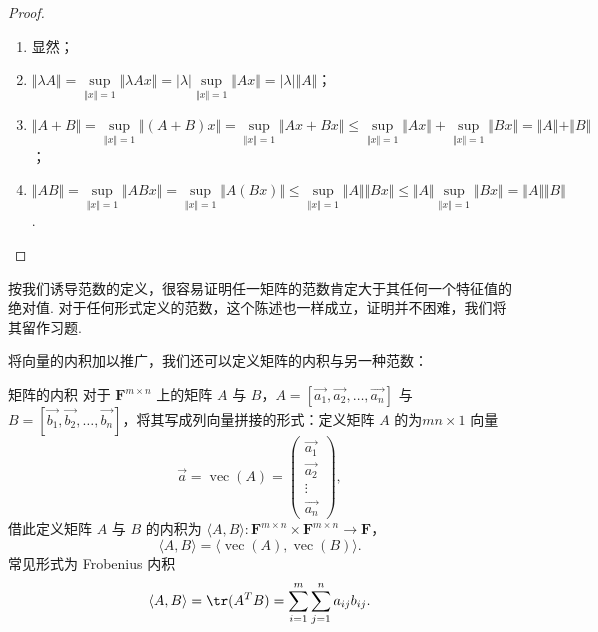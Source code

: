 \begin{proof}
    \begin{enumerate}
        \item 显然；
        \item $\Vert \lambda A\Vert=\sup\limits_{\Vert x\Vert =  1}\Vert \lambda Ax\Vert = \vert\lambda\vert \sup\limits_{\Vert x\Vert = 1}\Vert Ax\Vert = \vert\lambda\vert \Vert A\Vert$；
        \item $\Vert A+B\Vert=\sup\limits_{\Vert x\Vert = 1}\Vert (A+B)x\Vert = \sup\limits_{\Vert x\Vert = 1}\Vert Ax + Bx\Vert\leqslant\sup\limits_{\Vert x\Vert = 1}\Vert Ax\Vert+\sup\limits_{\Vert x\Vert = 1}\Vert Bx\Vert=\Vert A\Vert+\Vert B\Vert$；
        \item $\Vert AB\Vert=\sup\limits_{\Vert x\Vert = 1}\Vert ABx\Vert=\sup\limits_{\Vert x\Vert = 1}\Vert A(Bx)\Vert\leqslant\sup\limits_{\Vert x\Vert = 1}\Vert A\Vert\Vert Bx\Vert\leqslant\Vert A\Vert\sup\limits_{\Vert x\Vert = 1}\Vert Bx\Vert=\Vert A\Vert\Vert B\Vert$.
    \end{enumerate}
\end{proof}

按我们诱导范数的定义，很容易证明任一矩阵的范数肯定大于其任何一个特征值的绝对值. 对于任何形式定义的范数，这个陈述也一样成立，证明并不困难，我们将其留作习题.


将向量的内积加以推广，我们还可以定义矩阵的内积与另一种范数：

\begin{definition}{矩阵的内积}{} 
    对于 $\mathbf{F}^{m\times n}$ 上的矩阵 $A$ 与 $B$，$A = \left[\vec{a_1}, \vec{a_2}, \ldots, \vec{a_n}\right]$ 与 $B = \left[\vec{b_1}, \vec{b_2}, \ldots, \vec{b_n}\right]$，将其写成列向量拼接的形式：定义矩阵 $A$ 的为$mn \times 1$ 向量 \[\vec{a} = \operatorname{vec}(A) = \begin{pmatrix} \vec{a_1} \\ \vec{a_2} \\ \vdots \\ \vec{a_n} \end{pmatrix},\]
    借此定义矩阵 $A$ 与 $B$ 的内积为 $\langle A, B\rangle \colon \mathbf{F}^{m\times n}\times\mathbf{F}^{m\times n}\to\mathbf{F}$，\[\langle A, B\rangle = \langle \operatorname{vec}(A), \operatorname{vec}(B)\rangle.\]
    常见形式为 Frobenius 内积 \[\langle A, B\rangle = \tr(A^{T}B) = \sum_{i=1}^{m}\sum_{j=1}^{n}a_{ij}b_{ij}.\]
\end{definition}

